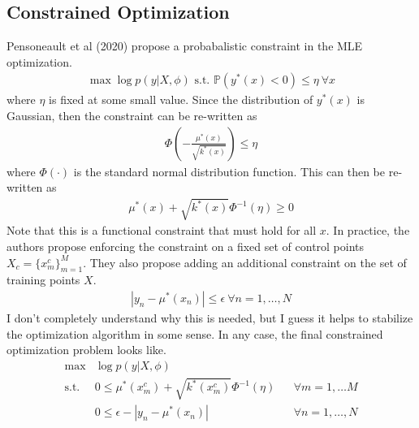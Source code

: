 \documentclass[12pt]{article}
\newcommand*{\abs}[1]{\left\lvert#1\right\rvert}
\newcommand{\Prob}{\mathbb{P}}
\begin{document}
\subsection{Constrained Optimization}
Pensoneault et al (2020) propose a probabalistic constraint in the MLE optimization. 
\begin{align*}
\max \log p(y|X, \phi) \text{ s.t. } \Prob(y^*(x) < 0) \leq \eta \ \forall x
\end{align*}
where $\eta$ is fixed at some small value. Since the distribution of $y^*(x)$ is Gaussian, then the constraint can be re-written as 
\begin{align*}
\Phi\left(-\frac{\mu^*(x)}{\sqrt{k^*(x)}} \right) \leq \eta
\end{align*}
where $\Phi(\cdot)$ is the standard normal distribution function. This can then be re-written as 
\begin{align*}
\mu^*(x) + \sqrt{k^*(x)} \Phi^{-1}(\eta) \geq 0
\end{align*}
Note that this is a functional constraint that must hold for all $x$. In practice, the authors propose enforcing the constraint on a fixed set of 
control points $X_c = \{x^c_m\}_{m = 1}^{M}$. They also propose adding an additional constraint on the set of training points $X$. 
\begin{align*}
\abs{y_n - \mu^*(x_n)} \leq \epsilon \ \forall n = 1, \dots, N
\end{align*}
I don't completely understand why this is needed, but I guess it helps to stabilize the optimization algorithm in some sense. In any case, the final 
constrained optimization problem looks like. 
\begin{align*}
\max &\log p(y|X, \phi) \\
\text{s.t. } &0 \leq \mu^*(x^c_m) + \sqrt{k^*(x^c_m)} \Phi^{-1}(\eta) &&\forall m = 1, \dots M \\
&0 \leq \epsilon - \abs{y_n - \mu^*(x_n)} &&\forall n = 1, \dots, N
\end{align*}




 

\end{document}
